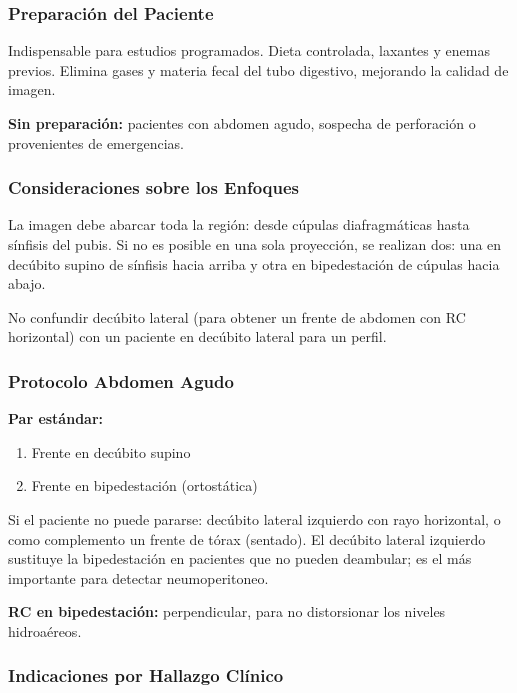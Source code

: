 	\subsubsection*{Preparación del Paciente}
	
	Indispensable para estudios programados. Dieta controlada, laxantes y enemas previos. Elimina gases y materia fecal del tubo digestivo, mejorando la calidad de imagen.
	
	\textbf{Sin preparación:} pacientes con abdomen agudo, sospecha de perforación o provenientes de emergencias.
	
	\subsubsection*{Consideraciones sobre los Enfoques}
	
	La imagen debe abarcar toda la región: desde cúpulas diafragmáticas hasta sínfisis del pubis. Si no es posible en una sola proyección, se realizan dos: una en decúbito supino de sínfisis hacia arriba y otra en bipedestación de cúpulas hacia abajo.
	
	No confundir decúbito lateral (para obtener un frente de abdomen con RC horizontal) con un paciente en decúbito lateral para un perfil.
	
	\subsubsection*{Protocolo Abdomen Agudo}
	
	\textbf{Par estándar:}
	\begin{enumerate}
		\item Frente en decúbito supino
		\item Frente en bipedestación (ortostática)
	\end{enumerate}
	
	Si el paciente no puede pararse: decúbito lateral izquierdo con rayo horizontal, o como complemento un frente de tórax (sentado). El decúbito lateral izquierdo sustituye la bipedestación en pacientes que no pueden deambular; es el más importante para detectar neumoperitoneo.
	
	\textbf{RC en bipedestación:} perpendicular, para no distorsionar los niveles hidroaéreos.
	
	\subsubsection*{Indicaciones por Hallazgo Clínico}
	
